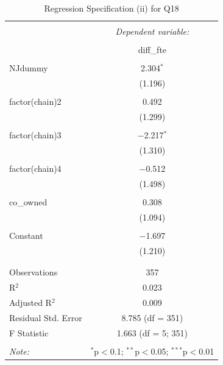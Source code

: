 \documentclass[
]{article}
\begin{document}
\begin{table}[!htbp] \centering 
  \caption{Regression Specification (ii) for Q18} 
  \label{} 
\begin{tabular}{@{\extracolsep{5pt}}lc} 
\\[-1.8ex]\hline 
\hline \\[-1.8ex] 
 & \multicolumn{1}{c}{\textit{Dependent variable:}} \\ 
\cline{2-2} 
\\[-1.8ex] & diff\_fte \\ 
\hline \\[-1.8ex] 
 NJdummy & 2.304$^{*}$ \\ 
  & (1.196) \\ 
  & \\ 
 factor(chain)2 & 0.492 \\ 
  & (1.299) \\ 
  & \\ 
 factor(chain)3 & $-$2.217$^{*}$ \\ 
  & (1.310) \\ 
  & \\ 
 factor(chain)4 & $-$0.512 \\ 
  & (1.498) \\ 
  & \\ 
 co\_owned & 0.308 \\ 
  & (1.094) \\ 
  & \\ 
 Constant & $-$1.697 \\ 
  & (1.210) \\ 
  & \\ 
\hline \\[-1.8ex] 
Observations & 357 \\ 
R$^{2}$ & 0.023 \\ 
Adjusted R$^{2}$ & 0.009 \\ 
Residual Std. Error & 8.785 (df = 351) \\ 
F Statistic & 1.663 (df = 5; 351) \\ 
\hline 
\hline \\[-1.8ex] 
\textit{Note:}  & \multicolumn{1}{r}{$^{*}$p$<$0.1; $^{**}$p$<$0.05; $^{***}$p$<$0.01} \\ 
\end{tabular} 
\end{table}

\newpage

\setcounter{table}{0} \renewcommand{\thetable}{\arabic{table}}
\end{document}
